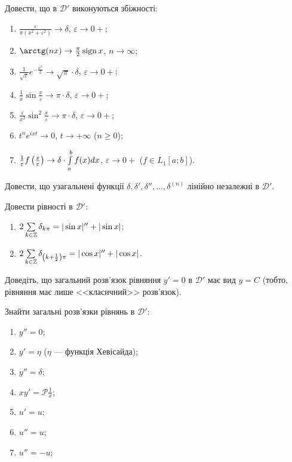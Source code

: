 \begin{exercise}
    Довести, що в $\mathcal{D}'$ виконуються збіжності:
    \begin{enumerate}
        \item $\frac{\varepsilon}{\pi (x^2 + \varepsilon^2)} \to \delta$, $\varepsilon \to 0 +$;
        \item $\arctg(nx) \to \frac{\pi}{2} \sgn x$, $n \to \infty$;
        \item $\frac{1}{\sqrt{\varepsilon}} e^{-\frac{x^2}{2}} \to \sqrt{\pi} \cdot \delta$, $\varepsilon \to 0 +$;
        \item $\frac{1}{x} \sin \frac{x}{\varepsilon} \to \pi \cdot \delta$, $\varepsilon \to 0 +$;
        \item $\frac{\varepsilon}{x^2} \sin^2 \frac{x}{\varepsilon} \to \pi \cdot \delta$, $\varepsilon \to 0 +$;
        \item $t^n e^{ixt} \to 0$, $t \to +\infty$ ($n \geq 0$);
        \item $\frac{1}{\varepsilon} f\left( \frac{x}{\varepsilon}\right) \to \delta \cdot \int\limits_{a}^{b} f(x) dx$, $\varepsilon \to 0+$ ($f \in L_1 [a; b]$). 
    \end{enumerate}
\end{exercise}
\begin{exercise}
    Довести, що узагальнені функції $\delta, \delta', \delta'', ..., \delta^{(n)}$
    лінійно незалежні в $\mathcal{D}'$.
\end{exercise}
\begin{exercise}\label{N:3_2_21}
    Довести рівності в $\mathcal{D}'$:
    \begin{enumerate}
        \item $2 \sum\limits_{k \in \mathbb{Z}}^{} \delta_{k \pi} = |\sin x|'' + |\sin x|$;
        \item $2 \sum\limits_{k \in \mathbb{Z}}^{} \delta_{\left(k+\frac{1}{2}\right) \pi} = |\cos x|'' + |\cos x|$.
    \end{enumerate}
\end{exercise}
\begin{exercise}
    Доведіть, що загальний розв'язок рівняння $y' = 0$ в $\mathcal{D}'$ має вид $y = C$ 
    (тобто, рівняння має лише <<класичний>> розв'язок).
\end{exercise}
\begin{exercise}
    Знайти загальні розв'язки рівнянь в $\mathcal{D}'$:
    \begin{enumerate}
        \item $y'' = 0$;
        \item $y' = \eta$ ($\eta$ --- функція Хевісайда);
        \item $y'' = \delta$;
        \item $x y' = \mathcal{P}\frac{1}{x}$;
        \item $u' = u$;
        \item $u'' = u$;
        \item $u'' = -u$; 
    \end{enumerate}
\end{exercise}
